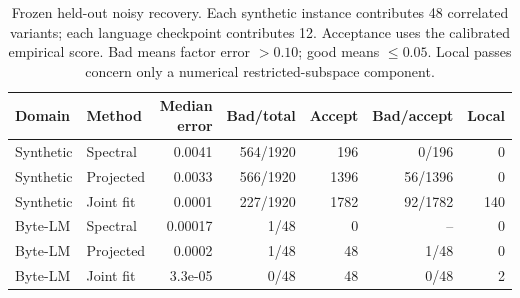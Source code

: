 \begin{table}[t]
\centering
\small
\caption{Frozen held-out noisy recovery. Each synthetic instance contributes 48 correlated variants; each language checkpoint contributes 12. Acceptance uses the calibrated empirical score. Bad means factor error $>0.10$; good means $\le0.05$. Local passes concern only a numerical restricted-subspace component.}
\label{tab:trusted-recovery}
\begin{tabular}{llrrrrr}
\toprule
Domain & Method & Median error & Bad/total & Accept & Bad/accept & Local \\
\midrule
Synthetic & Spectral & 0.0041 & 564/1920 & 196 & 0/196 & 0 \\
Synthetic & Projected & 0.0033 & 566/1920 & 1396 & 56/1396 & 0 \\
Synthetic & Joint fit & 0.0001 & 227/1920 & 1782 & 92/1782 & 140 \\
Byte-LM & Spectral & 0.00017 & 1/48 & 0 & -- & 0 \\
Byte-LM & Projected & 0.0002 & 1/48 & 48 & 1/48 & 0 \\
Byte-LM & Joint fit & 3.3e-05 & 0/48 & 48 & 0/48 & 2 \\
\bottomrule
\end{tabular}
\end{table}
